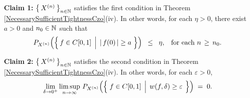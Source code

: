 \vskip 0.2cm
\noindent
\begin{center}
\begin{minipage}{6.0in}
\noindent
	\textbf{Claim 1:}\quad
	$\left\{\,X^{(n)}\,\right\}_{n\in\mathbb{N}}$ satisfies the first condition in Theorem \ref{NecessarySufficientTightnessCzo}(iv).
	\vskip 0.1cm
	\noindent
	In other words, for each $\eta > 0$, there exist $a > 0$ and $n_{0} \in \mathbb{N}$ such that
	\begin{equation*}
	P_{X^{(n)}}\!\left(\left\{\,f \in \Czo \;\left\vert\;\, \vert\,f(0)\,\vert \overset{{\color{white}.}}{\geq} a \right.\,\right\}\right)
	\;\;\leq\;\; \eta,
	\;\;\;\textnormal{for each $n \,\geq\, n_{0}$}.
	\end{equation*}

	\vskip 0.3cm
	\noindent
	\textbf{Claim 2:}\quad
	$\left\{\,X^{(n)}\,\right\}_{n\in\mathbb{N}}$ satisfies the second condition in Theorem \ref{NecessarySufficientTightnessCzo}(iv).
	\vskip 0.1cm
	\noindent
	In other words, for each $\varepsilon > 0$,
	\begin{equation*}
	\lim_{\delta\rightarrow 0^{+}}
	\limsup_{n\rightarrow\infty}\,
	P_{X^{(n)}}\!\left(\left\{\;
		f \in \Czo
		\;\left\vert\;\,
		w(f,\delta) \overset{{\color{white}.}}{\geq} \varepsilon
		\right.
	\;\right\}\right)
	\;=\; 0.		
	\end{equation*}
\end{minipage}
\end{center}

